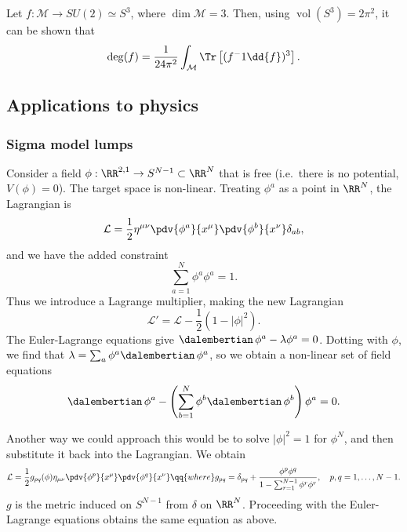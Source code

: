 \documentclass{jknotes}
\begin{document}
\begin{eg}
    Let \(f:\mathcal{M}\to SU(2)\simeq S^3\), where \(\dim \mathcal{M}=3\). Then, using \(\operatorname{vol}(S^3) = 2\pi^2\), it can be shown that
    \begin{equation}
        \deg(f) = \frac{1}{24\pi^2}\int_{\mathcal{M}}\Tr\left[(f^-1\dd{f})^3\right].
    \end{equation}
\end{eg}

\subsection{Applications to physics}
\subsubsection*{Sigma model lumps}
Consider a field \(\phi:\RR^{2,1}\to S^{N-1}\subset\RR^N\) that is free (i.e.\ there is no potential, \(V(\phi)=0\)). The target space is non-linear. Treating \(\phi^a\) as a point in \(\RR^N\), the Lagrangian is
\begin{equation}
    \mathcal{L} = \frac{1}{2}\eta^{\mu\nu}\pdv{\phi^a}{x^\mu}\pdv{\phi^b}{x^\nu}\delta_{ab},
\end{equation}
and we have the added constraint
\begin{equation}
    \sum^N_{a=1} \phi^a \phi^a = 1.
\end{equation}
Thus we introduce a Lagrange multiplier, making the new Lagrangian
\begin{equation}
    \mathcal{L}'= \mathcal{L} - \frac{1}{2}\left(1-|\phi|^2\right).
\end{equation}
The Euler-Lagrange equations give \(\dalembertian\,\phi^a-\lambda\phi^a=0\). Dotting with \(\phi\), we find that \(\lambda = \sum_a\phi^a\dalembertian\,\phi^a\), so we obtain a non-linear set of field equations
\begin{equation}
    \dalembertian\,\phi^a - \left(\sum_{b=1}^N\phi^b\dalembertian\,\phi^b\right)\phi^a=0.
\end{equation}

Another way we could approach this would be to solve \(|\phi|^2=1\) for \(\phi^N\), and then substitute it back into the Lagrangian. We obtain
\begin{equation}
    \mathcal{L} = \frac{1}{2}g_{pq}(\phi)\eta_{\mu\nu}\pdv{\phi^p}{x^\mu}\pdv{\phi^q}{x^\nu} \qq{where}
    g_{pq} = \delta_{pq} + \frac{\phi^p\phi^q}{1-\sum_{r=1}^{N-1}\phi^r\phi^r},\quad
    p,q=1,\dots,N-1.
\end{equation}
\(g\) is the metric induced on \(S^{N-1}\) from \(\delta\) on \(\RR^N\). Proceeding with the Euler-Lagrange equations obtains the same equation as above.
\end{document}
